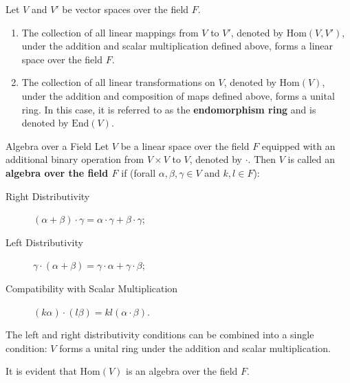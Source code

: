\documentclass[11pt]{../../TexTemplate/elegantbook} %
\begin{document}
\vspace{0.7cm}
Let \(V\) and \(V'\) be vector spaces over the field \(F\).
\begin{enumerate}
    \item The collection of all linear mappings from \(V\) to \(V'\), denoted by \(\mathrm{Hom}(V,V')\), 
        under the addition and scalar multiplication defined above, forms a linear space over the field \(F\).
    
    \item The collection of all linear transformations on \(V\), denoted by \(\mathrm{Hom}(V)\), 
        under the addition and composition of maps defined above, forms a unital ring. 
        In this case, it is referred to as the \textbf{endomorphism ring} and is denoted by \(\mathrm{End}(V)\).
\end{enumerate}


\begin{definition}{Algebra over a Field}
    Let \(V\) be a linear space over the field \(F\) 
    equipped with an additional binary operation from \(V\times V\) to \(V\), denoted by \(\cdot\).
    Then \(V\) is called an \textbf{algebra over the field \(F\)} if
    (forall \(\alpha, \beta, \gamma \in V\) and \(k, l \in F\)):
    \begin{description}
        \item [Right Distributivity] \((\alpha + \beta) \cdot \gamma = \alpha \cdot \gamma + \beta \cdot \gamma\);
        \item [Left Distributivity] \(\gamma \cdot (\alpha + \beta) = \gamma \cdot \alpha + \gamma \cdot \beta\);
        \item [Compatibility with Scalar Multiplication] \((k\alpha)\cdot(l \beta) = kl(\alpha \cdot \beta)\).
    \end{description}
\end{definition}
\begin{remark}
    The left and right distributivity conditions can be combined into a single condition:
    \(V\) forms a unital ring under the addition and scalar multiplication.
\end{remark}

It is evident that \(\mathrm{Hom}(V)\) is an algebra over the field \(F\).
\end{document}

